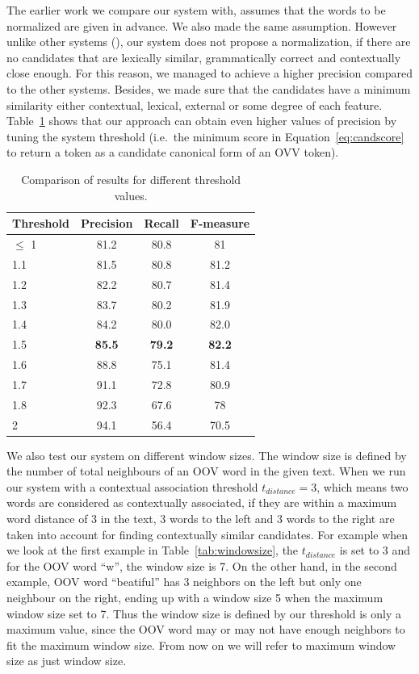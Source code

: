 \documentclass[a4paper,onesided,12pt]{report}
\begin{document}
The earlier work we compare our system with, assumes that the words to be normalized are given in advance. We also made the same assumption. However unlike other systems (\cite{DBLP:conf/emnlp/YangE13,liu2012broad,Han:2011:LNS:2002472.2002520}), our system does not propose a normalization, if there are no candidates that are lexically similar, grammatically correct and contextually close enough. For this reason, we managed to achieve a higher precision compared to the other systems. Besides, we made sure that the candidates have a minimum similarity either contextual, lexical, external or some degree of each feature. Table~\ref{tab:thresholds} shows that our approach can obtain even higher values of precision by tuning the system threshold (i.e.~the minimum score in Equation~\ref{eq:candscore} to return a token as a candidate canonical form of an OVV token).
\\
\begin{table}[thb]
  \caption{Comparison of results for different threshold values.}
  \centering
  \begin{tabular}[th]{|l|c|c|c|}
    \hline
    \textbf{Threshold} & \textbf{Precision} & \textbf{Recall} & \textbf{F-measure} \\
    \hline
    $\leq$ 1 & 81.2 &	80.8 &	81 \\\hline
    1.1 & 81.5 & 80.8 &	81.2 \\\hline
    1.2 & 82.2 &	80.7 &	81.4 \\\hline
    1.3 & 83.7 &	80.2 &	81.9 \\\hline
    1.4 & 84.2 &	80.0 &	82.0 \\\hline
    1.5 & \textbf{85.5} &  \textbf{79.2} &  \textbf{82.2} \\\hline
    1.6 & 88.8	& 75.1	& 81.4 \\\hline
    1.7	& 91.1	& 72.8	& 80.9 \\\hline
    1.8	& 92.3	& 67.6	& 78 \\\hline
    2	& 94.1	& 56.4	& 70.5 \\
    \hline
  \end{tabular}
\label{tab:thresholds}
\end{table}

We also test our system on different window sizes. The window size is defined by the number of total neighbours of an OOV word in the given text. When we run our system with a contextual association threshold $t_{distance}=3$, which means two words are considered as contextually associated, if they are within a maximum word distance of 3 in the text, 3 words to the left and 3 words to the right are taken into account for finding contextually similar candidates. For example when we look at the first example in Table~\ref{tab:windowsize}, the $t_{distance}$ is set to 3 and  for the OOV word ``w'', the window size is 7. On the other hand, in the second example, OOV word ``beatiful'' has 3 neighbors on the left but only one neighbour on the right, ending up with a window size 5 when the maximum window size set to 7. Thus the window size is defined by our threshold is only a maximum value, since the OOV word may or may not have enough neighbors to fit the maximum window size. From now on we will refer to maximum window size as just window size.
\end{document}
